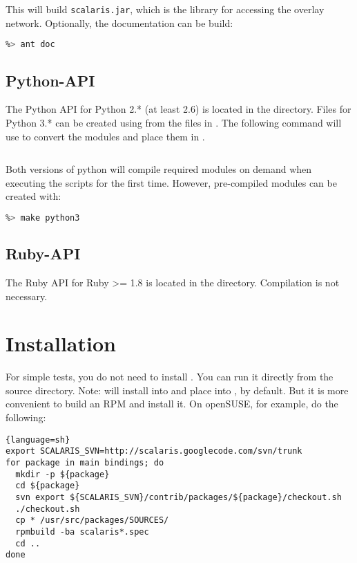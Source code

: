 This will build {\tt scalaris.jar}, which is the library for accessing
the overlay network. Optionally, the documentation can be build:
\begin{lstlisting}[language=sh]
%> cd java-api
%> ant doc
\end{lstlisting}

\subsection{Python-API}

The Python API for Python 2.* (at least 2.6) is located in the 
directory. Files for Python 3.* can be created using  from the files
in . The following command will use  to convert the
modules and place them in . 
\begin{lstlisting}[language=sh]
%> make python3
\end{lstlisting}
Both versions of python will compile required modules on demand when executing
the scripts for the first time. However, pre-compiled modules can be created
with:
\begin{lstlisting}[language=sh]
%> make python
%> make python3
\end{lstlisting}

\subsection{Ruby-API}

The Ruby API for Ruby >= 1.8 is located in the 
directory. Compilation is not necessary.

\section{Installation}
\label{sec:install}

For simple tests, you do not need to install \scalaris{}. You can run it
directly from the source directory. Note:  will install
\scalaris{} into  and place  into
, by default. But it is more convenient to build an RPM
and install it.
On openSUSE, for example, do the following:

\begin{lstlisting}{language=sh}
export SCALARIS_SVN=http://scalaris.googlecode.com/svn/trunk
for package in main bindings; do
  mkdir -p ${package}
  cd ${package}
  svn export ${SCALARIS_SVN}/contrib/packages/${package}/checkout.sh
  ./checkout.sh
  cp * /usr/src/packages/SOURCES/
  rpmbuild -ba scalaris*.spec
  cd ..
done
\end{lstlisting}

